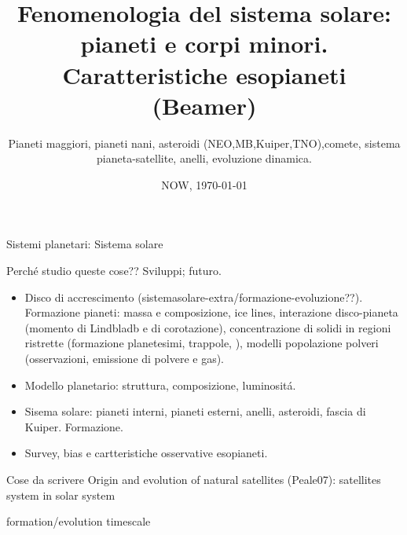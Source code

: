 \documentclass[10pt,xcolor={usenames},fleqn,mathserif,serif]{beamer}
\title{Fenomenologia del sistema solare: pianeti e corpi minori. Caratteristiche esopianeti (Beamer)}
\subtitle{Pianeti maggiori, pianeti nani, asteroidi (NEO,MB,Kuiper,TNO),comete, sistema pianeta-satellite, anelli, evoluzione dinamica.}
\date{NOW, \today}
\begin{document}



\begin{frame}
  \titlepage
\end{frame}


\begin{frame}{Sistemi planetari: Sistema solare}
\tableofcontents[onlyparts]
\end{frame}

\begin{wordonframe}{Perch\'e studio queste cose?? Sviluppi; futuro.}
\begin{itemize}
\item Disco di accrescimento (sistemasolare-extra/formazione-evoluzione??). Formazione pianeti: massa e composizione, ice lines, interazione disco-pianeta (momento di Lindbladb e di corotazione), concentrazione di solidi in regioni ristrette (formazione planetesimi, trappole, ), modelli popolazione polveri (osservazioni, emissione di polvere e gas).
\item Modello planetario: struttura, composizione, luminosit\'a.
\item Sisema solare: pianeti interni, pianeti esterni, anelli, asteroidi, fascia di Kuiper. Formazione.
\item Survey, bias e cartteristiche osservative esopianeti. 
\end{itemize}

\end{wordonframe}

\begin{wordonframe}{Cose da scrivere}
Origin and evolution of natural satellites (Peale07): satellites system in solar system
\listofframes
\end{wordonframe}

\begin{frame}{formation/evolution timescale}

\end{frame}
\end{document}
